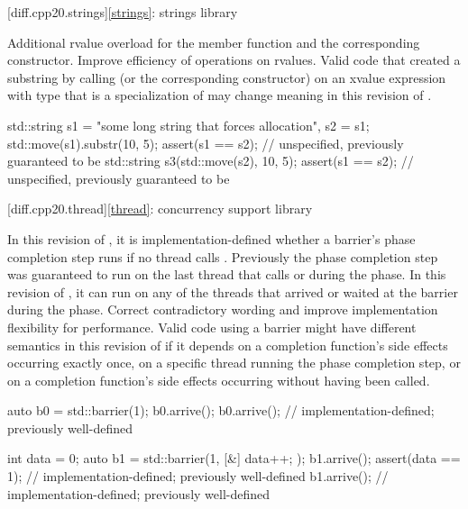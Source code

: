 [diff.cpp20.strings]{\ref*{strings}: strings library}

\change
Additional rvalue overload for the  member function and
the corresponding constructor.
\rationale
Improve efficiency of operations on rvalues.
\effect
Valid \CppXX{} code that created a substring
by calling  (or the corresponding constructor)
on an xvalue expression with type 
that is a specialization of 
may change meaning in this revision of \Cpp{}.
\begin{example}
\begin{codeblock}
std::string s1 = "some long string that forces allocation", s2 = s1;
std::move(s1).substr(10, 5);
assert(s1 == s2);       // unspecified, previously guaranteed to be 
std::string s3(std::move(s2), 10, 5);
assert(s1 == s2);       // unspecified, previously guaranteed to be 
\end{codeblock}
\end{example}

[diff.cpp20.thread]{\ref*{thread}: concurrency support library}

\change
In this revision of \Cpp{},
it is implementation-defined whether a barrier's phase completion step runs
if no thread calls .
Previously the phase completion step was guaranteed to run on the last thread that calls  or  during the phase.
In this revision of \Cpp{},
it can run on any of the threads that arrived or waited at the barrier
during the phase.
\rationale
Correct contradictory wording and
improve implementation flexibility for performance.
\effect
Valid \CppXX{} code using a barrier might have
different semantics in this revision of \Cpp{}
if it depends on a completion function's side effects occurring exactly once,
on a specific thread running the phase completion step, or
on a completion function's side effects occurring
without  having been called.
\begin{example}
\begin{codeblock}
auto b0 = std::barrier(1);
b0.arrive();
b0.arrive();            // implementation-defined; previously well-defined

int data = 0;
auto b1 = std::barrier(1, [&] { data++; });
b1.arrive();
assert(data == 1);      // implementation-defined; previously well-defined
b1.arrive();            // implementation-defined; previously well-defined
\end{codeblock}
\end{example}


